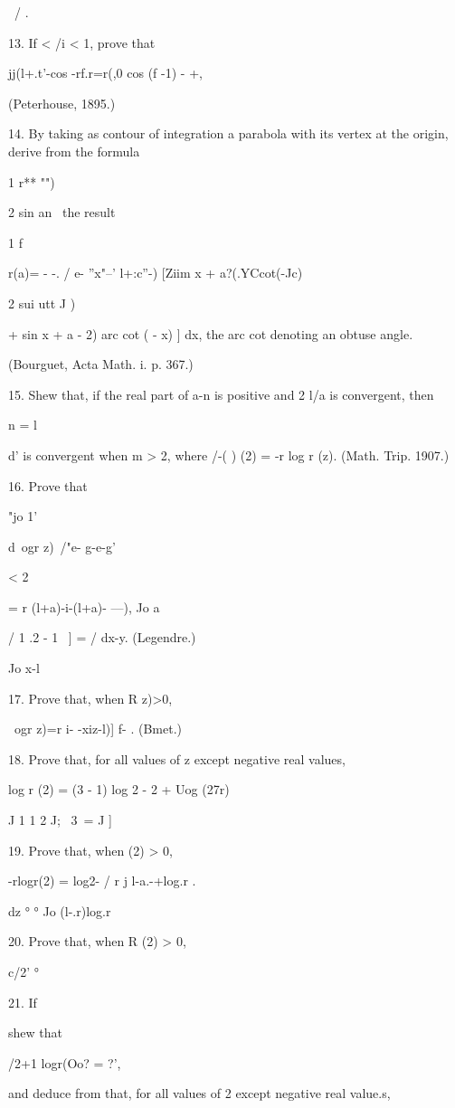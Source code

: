 \ / .

13. If < /i < 1, prove that

jj(l+.t'-cos -rf.r=r(,0 cos (f -1) - +,

(Peterhouse, 1895.)

14. By taking as contour of integration a parabola with its vertex at
the origin, derive from the formula

1 r** "")

2 sin an \ the result

1 f

r(a)= - -. / e- ''x"--' l+:c''-) [Ziim x + a?(.YCcot(-Jc)

2 sui utt J )

+ sin x + a - 2) arc cot ( - x) ] dx, the arc cot denoting an obtuse
angle.

(Bourguet, Acta Math. i. p. 367.)

15. Shew that, if the real part of a-n is positive and 2 l/a is
convergent, then

n = l

d' is convergent when m > 2, where \//-( ) (2) = -r log r (z). (Math.
Trip. 1907.)

16. Prove that

"jo 1'

d\ ogr z)\ /"e- g-e-g'

< 2

= r (l+a)-i-(l+a)- ---), Jo a

/ 1 .2 - 1 \ ] = / dx-y. (Legendre.)

Jo x-l

%
%

17. Prove that, when R z)>0,

\ ogr z)=r i- -xiz-l)] f- . (Bmet.)

18. Prove that, for all values of z except negative real values,

log r (2) = (3 - 1) log 2 - 2 + Uog (27r)

J 1 1 2 J; \ 3\ = J ]

19. Prove that, when (2) > 0,

-rlogr(2) = log2- / r j l-a.-+log.r .

dz ° ° Jo (l-.r)log.r

20. Prove that, when R (2) > 0,

c/2' °

21. If

shew that

/2+1 logr(Oo? = ?',

and deduce from that, for all values of 2 except negative real
value.s,

